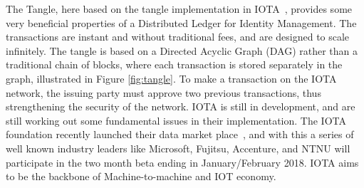 The Tangle, here based on the tangle implementation in IOTA~\cite{IOTA_Whitepaper}, provides some very beneficial properties of a Distributed Ledger for Identity Management. The transactions are instant and without traditional fees, and are designed to scale infinitely. The tangle is based on a Directed Acyclic Graph (DAG) rather than a traditional chain of blocks, where each transaction is stored separately in the graph, illustrated in Figure \ref{fig:tangle}. To make a transaction on the IOTA network, the issuing party must approve two previous transactions, thus strengthening the security of the network. IOTA is still in development, and are still working out some fundamental issues in their implementation. The IOTA foundation recently launched their data market place~\cite{IOTA_Marketplace}, and with this a series of well known industry leaders like Microsoft, Fujitsu, Accenture, and NTNU will participate in the two month beta ending in January/February 2018. IOTA aims to be the backbone of Machine-to-machine and IOT economy.

